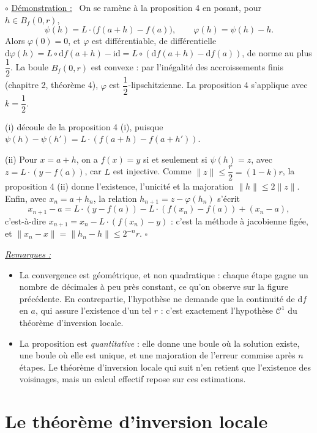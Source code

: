 \documentclass[a4paper,twoside]{report}
\newenvironment{demo}%
 {\par\needspace{4\baselineskip}\vspace{1mm}\noindent$\circ$ \underline{Démonstration :}~\setlength{\parskip}{3pt plus 1pt}}%
 {\hfill$\square$\par\vspace{2mm}}
\newenvironment{remarques}%
 {\par\needspace{6\baselineskip}\vspace{1mm}\begin{list}{}{\leftmargin=1cm \rightmargin=0.5cm}\item[]%
  \textit{\underline{Remarques :}}%
  \begin{itemize}[label=$\bullet$,leftmargin=0.45cm,topsep=3pt,itemsep=4pt]}%
 {\end{itemize}\end{list}\vspace{1mm}}
\newcommand{\id}{\mathrm{id}}                     %
\newcommand{\dd}{\mathrm{d}}                      %
\newcommand{\norme}[1]{\lVert #1 \rVert}         %
\newcommand{\Bf}{B_{f}}                           %
\newcommand{\Cc}{\mathcal{C}}                     %
\begin{document}
\begin{demo}
On se ramène à la proposition 4 en posant, pour $h \in \Bf(0, r)$,
\[ \psi(h) = L\cdot\big(f(a + h) - f(a)\big), \qquad \varphi(h) = \psi(h) - h. \]
Alors $\varphi(0) = 0$, et $\varphi$ est différentiable, de différentielle $\dd\varphi(h) = L \circ \dd f(a + h) - \id = L \circ (\dd f(a + h) - \dd f(a))$, de norme au plus $\dfrac{1}{2}$. La boule $\Bf(0, r)$ est convexe : par l'inégalité des accroissements finis (chapitre 2, théorème 4), $\varphi$ est $\dfrac{1}{2}$-lipschitzienne. La proposition 4 s'applique avec $k = \dfrac{1}{2}$.

(i) découle de la proposition 4 (i), puisque $\psi(h) - \psi(h') = L\cdot(f(a + h) - f(a + h'))$.

(ii) Pour $x = a + h$, on a $f(x) = y$ si et seulement si $\psi(h) = z$, avec $z = L\cdot(y - f(a))$, car $L$ est injective. Comme $\norme{z} \leqslant \dfrac{r}{2} = (1 - k)r$, la proposition 4 (ii) donne l'existence, l'unicité et la majoration $\norme{h} \leqslant 2\norme{z}$. Enfin, avec $x_{n} = a + h_{n}$, la relation $h_{n + 1} = z - \varphi(h_{n})$ s'écrit
\[ x_{n + 1} - a = L\cdot(y - f(a)) - L\cdot(f(x_{n}) - f(a)) + (x_{n} - a), \]
c'est-à-dire $x_{n + 1} = x_{n} - L\cdot(f(x_{n}) - y)$ : c'est la méthode à jacobienne figée, et $\norme{x_{n} - x} = \norme{h_{n} - h} \leqslant 2^{-n}r$.
\end{demo}

\begin{remarques}
  \item La convergence est géométrique, et non quadratique : chaque étape gagne un nombre de décimales à peu près constant, ce qu'on observe sur la figure précédente. En contrepartie, l'hypothèse ne demande que la continuité de $\dd f$ en $a$, qui assure l'existence d'un tel $r$ : c'est exactement l'hypothèse $\Cc^{1}$ du théorème d'inversion locale.
  \item La proposition est \emph{quantitative} : elle donne une boule où la solution existe, une boule où elle est unique, et une majoration de l'erreur commise après $n$ étapes. Le théorème d'inversion locale qui suit n'en retient que l'existence des voisinages, mais un calcul effectif repose sur ces estimations.
\end{remarques}
\section[Inversion locale]{Le théorème d'inversion locale}
\end{document}
